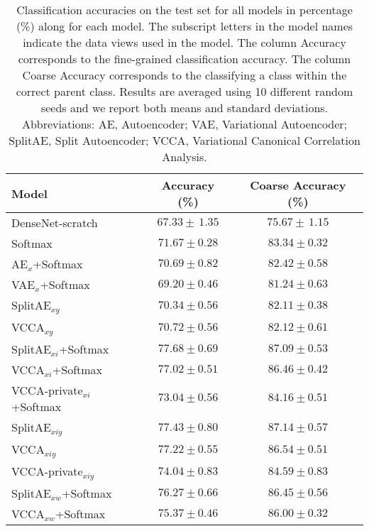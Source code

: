 
\begin{table}[t]
\centering
\caption{Classification accuracies on the test set for all models in percentage (\%) along for each model. The subscript letters in the model names indicate the data views used in the model. The column Accuracy corresponds to the fine-grained classification accuracy. The column Coarse Accuracy corresponds to the classifying a class within the correct parent class. Results are averaged using 10 different random seeds and we report both means and standard deviations. Abbreviations: AE, Autoencoder; VAE, Variational Autoencoder; SplitAE, Split Autoencoder; VCCA, Variational Canonical Correlation Analysis.
}
\vspace{-2mm}
\begin{tabular}{l c c} 
    \hline 
    Model & Accuracy (\%) & Coarse Accuracy (\%) \\ 
    \hline
    DenseNet-scratch & $67.33 \pm \, 1.35$ & $75.67 \pm \, 1.15$ \\ 
    \rowcolor{gray!30}
    Softmax & $71.67 \pm 0.28$ & $83.34 \pm 0.32$ \\ 
    \hline
    AE$_{x}$+Softmax & $70.69 \pm 0.82$ & $82.42 \pm 0.58$ \\ 
    \rowcolor{gray!30}
    VAE$_{x}$+Softmax & $69.20 \pm 0.46$ & $81.24 \pm 0.63$ \\ 
    \hline
    SplitAE$_{x y}$ & $70.34 \pm 0.56$ & $82.11 \pm 0.38$ \\ 
    \rowcolor{gray!30}   
    VCCA$_{x y}$ & $70.72 \pm 0.56$ & $82.12 \pm 0.61$ \\ 
    \hline
    SplitAE$_{x i}$+Softmax & $77.68 \pm 0.69$ & $87.09 \pm 0.53$ \\ 
    \rowcolor{gray!30}  
    VCCA$_{x i}$+Softmax & $77.02 \pm 0.51$ & $86.46 \pm 0.42$ \\ 
    VCCA-private$_{x i}$+Softmax & $73.04 \pm 0.56$ & $84.16 \pm 0.51$ \\ \hline 
    \rowcolor{gray!30}
    SplitAE$_{x i y}$ & $77.43 \pm 0.80$ & $87.14 \pm 0.57$ \\ 
    VCCA$_{x i y}$ &  $77.22 \pm 0.55$ & $86.54 \pm 0.51$ \\ 
    \rowcolor{gray!30}  
    VCCA-private$_{x i y}$ & $74.04 \pm 0.83$ & $84.59 \pm 0.83$ \\
    \hline
    SplitAE$_{x w}$+Softmax & $76.27 \pm 0.66$ & $86.45 \pm 0.56$ \\
    \rowcolor{gray!30}  
    VCCA$_{x w}$+Softmax & $75.37 \pm 0.46$ & $86.00 \pm 0.32$\\

\end{tabular}
\end{table}
